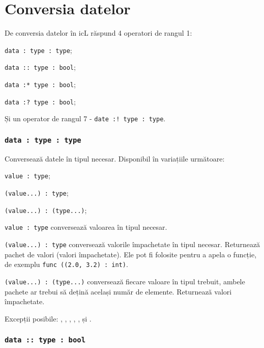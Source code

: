 \section{Conversia datelor}

De conversia datelor în icL răspund 4 operatori de rangul 1:
\begin{icItems}
	\item \lstinline|data : type : type|;
	\item \lstinline|data :: type : bool|;
	\item \lstinline|data :* type : bool|;
	\item \lstinline|data :? type : bool|;
\end{icItems}

Și un operator de rangul 7 - \lstinline|date :! type : type|.

\subsubsection{\lstinline|data : type : type|}

Conversează datele în tipul necesar. Disponibil în variațiile următoare:
\begin{icItems}
	\item \lstinline|value : type|;
	\item \lstinline|(value...) : type|;
	\item \lstinline|(value...) : (type...)|;
\end{icItems}

\lstinline|value : type| conversează valoarea în tipul necesar.

\lstinline|(value...) : type| conversează valorile împachetate în tipul necesar. Returnează pachet de valori (valori împachetate). Ele pot fi folosite pentru a apela o funcție, de exemplu \lstinline|func ((2.0, 3.2) : int)|.

\lstinline|(value...) : (type...)| conversează fiecare valoare în tipul trebuit, ambele pachete ar trebui să dețină același număr de elemente. Returnează valori împachetate.

Excepții posibile: , , , , ,  și .

\subsubsection{\lstinline|data :: type : bool|}


